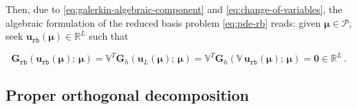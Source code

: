 \documentclass[longtitle]{elsarticle}
\numberwithin{equation}{section}
\theoremstyle{theorem}
\theoremstyle{definition}
\theoremstyle{remark}
\theoremstyle{proposition}
\numberwithin{figure}{section}
\newcommand{\bg}[1]{\boldsymbol{#1}}
\begin{document}
		Then, due to \eqref{eq:galerkin-algebraic-component} and \eqref{eq:change-of-variables}, the algebraic formulation of the reduced basis problem \eqref{eq:pde-rb} reads: given $\bg{\mu} \in \mathcal{P}$, seek $\mathbf{u}_{\texttt{rb}}(\bg{\mu}) \in \mathbb{R}^L$ such that
		\begin{linenomath}\begin{linenomath}\begin{equation}
			\label{eq:pde-rb-algebraic}
			\mathbf{G}_{\texttt{rb}}(\mathbf{u}_{\texttt{rb}}(\bg{\mu}); \, \bg{\mu}) = \mathbb{V}^T \mathbf{G}_h(\mathbf{u}_L(\bg{\mu}); \, \bg{\mu}) = \mathbb{V}^T \mathbf{G}_h(\mathbb{V} \, \mathbf{u}_{\texttt{rb}}(\bg{\mu}); \, \bg{\mu}) = \bg{0} \in \mathbb{R}^L \, . 
		\end{equation}\end{linenomath}\end{linenomath}

		
	\subsection{Proper orthogonal decomposition}
	\label{section:Proper Orthogonal Decomposition} 
		
\end{document}

